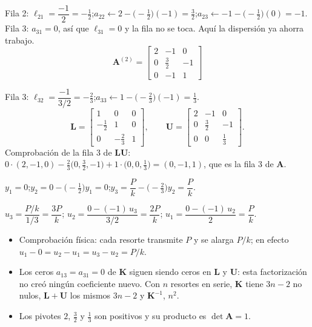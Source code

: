 \documentclass[11pt,a4paper]{article}
\newcommand{\mK}{\bm{K}}
\newcommand{\tf}[2]{\tfrac{#1}{#2}}
\begin{document}
\begin{paso}[title={Paso 1: pivote $a_{11}=2$}]
Fila 2: $\ell_{21}=\dfrac{-1}{2}=-\tf12$;\quad $a_{22}\leftarrow 2-\bigl(-\tf12\bigr)(-1)=\tf32$;\quad $a_{23}\leftarrow -1-\bigl(-\tf12\bigr)(0)=-1$.\\
Fila 3: $a_{31}=0$, así que $\ell_{31}=0$ y la fila no se toca. Aquí la dispersión ya ahorra trabajo.
\[
\bm{A}^{(2)}=\begin{bmatrix}2&-1&0\\0&\tf32&-1\\0&-1&1\end{bmatrix}
\]
\end{paso}

\begin{paso}[title={Paso 2: pivote $a_{22}=\tf32$}]
Fila 3: $\ell_{32}=\dfrac{-1}{3/2}=-\tf23$;\quad $a_{33}\leftarrow 1-\bigl(-\tf23\bigr)(-1)=\tf13$.
\[
\bm{L}=\begin{bmatrix}1&0&0\\-\tf12&1&0\\0&-\tf23&1\end{bmatrix},\qquad
\bm{U}=\begin{bmatrix}2&-1&0\\0&\tf32&-1\\0&0&\tf13\end{bmatrix}.
\]
Comprobación de la fila 3 de $\bm{L}\bm{U}$: $0\cdot(2,-1,0)-\tf23\bigl(0,\tf32,-1\bigr)+1\cdot\bigl(0,0,\tf13\bigr)=(0,-1,1)$, que es la fila 3 de $\bm{A}$.
\end{paso}

\begin{paso}[title={Paso 3: sustitución hacia adelante, $\bm{L}\bm{y}=\bm{b}$, con $\bm{b}=(0,0,P/k)$}]
$y_1=0$;\quad $y_2=0-\bigl(-\tf12\bigr)y_1=0$;\quad $y_3=\dfrac{P}{k}-\bigl(-\tf23\bigr)y_2=\dfrac{P}{k}$.
\end{paso}

\begin{paso}[title={Paso 4: sustitución hacia atrás, $\bm{U}\bm{u}=\bm{y}$}]
$u_3=\dfrac{P/k}{1/3}=\dfrac{3P}{k}$;\quad
$u_2=\dfrac{0-(-1)\,u_3}{3/2}=\dfrac{2P}{k}$;\quad
$u_1=\dfrac{0-(-1)\,u_2}{2}=\dfrac{P}{k}$.
\end{paso}

\begin{resultado}[title={Lo que muestra el ejemplo}]
\begin{itemize}[leftmargin=1.2em]
  \item Comprobación física: cada resorte transmite $P$ y se alarga $P/k$; en efecto $u_1-0=u_2-u_1=u_3-u_2=P/k$.
  \item Los ceros $a_{13}=a_{31}=0$ de $\mK$ siguen siendo ceros en $\bm{L}$ y $\bm{U}$: esta factorización no creó ningún coeficiente nuevo. Con $n$ resortes en serie, $\mK$ tiene $3n-2$ no nulos, $\bm{L}+\bm{U}$ los mismos $3n-2$ y $\mK^{-1}$, $n^2$.
  \item Los pivotes $2$, $\tf32$ y $\tf13$ son positivos y su producto es $\det\bm{A}=1$.
\end{itemize}
\end{resultado}
\end{document}
